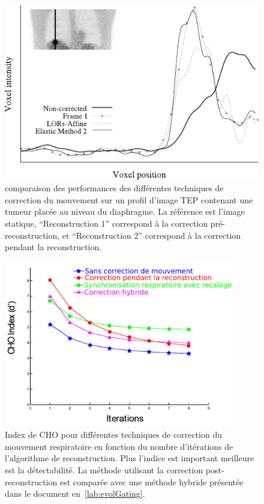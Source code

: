 \begin{figure}[h!]
	\begin{center}
		\includegraphics[width=12cm]{images/lamare2007list.pdf}
	\end{center}
	\caption[comparaison des performances des différentes techniques de correction du mouvement sur un profil d'image TEP]{comparaison des performances des différentes techniques de correction du mouvement sur un profil d'image TEP contenant une tumeur placée au niveau du diaphragme. La référence est l'image statique, ``Reconstruction 1'' correspond à la correction pré-reconstruction, et ``Reconstruction 2'' correspond à la correction pendant la reconstruction.} 
	\label{fig:lamare2007}
\end{figure}


\begin{figure}[h!]
	\begin{center}
			\includegraphics[width=10cm]{images/apportCHO}
	\end{center}
	\caption[Index de CHO pour différentes techniques de correction du mouvement respiratoire en fonction du nombre d'itérations de la reconstruction]{Index de CHO pour différentes techniques de correction du mouvement respiratoire en fonction du nombre d'itérations de l'algorithme de reconstruction. Plus l'indice est important meilleure est la détectabilité. La méthode utilisant la correction post-reconstruction est comparée avec une méthode hybride présentée dans le document en~\ref{lab:evolGating}.} 
	\label{fig:apportCHO}
\end{figure}


